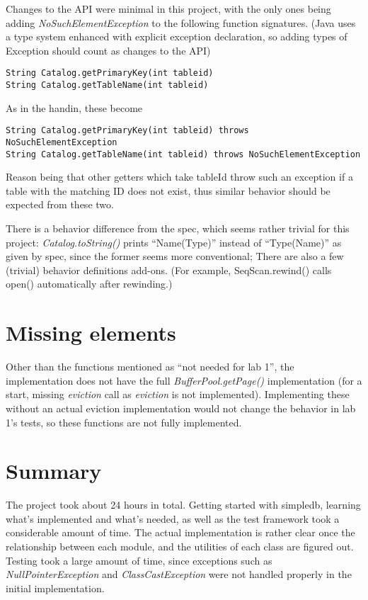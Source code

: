 \documentclass[11pt]{article}
\begin{document}
Changes to the API were minimal in this project, with the only ones being adding \textit{NoSuchElementException} to the following function signatures. (Java uses a type system enhanced with explicit exception declaration, so adding types of Exception should count as changes to the API)

\begin{lstlisting}
String Catalog.getPrimaryKey(int tableid) 
String Catalog.getTableName(int tableid) 
\end{lstlisting}
As in the handin, these become
\begin{lstlisting}
String Catalog.getPrimaryKey(int tableid) throws NoSuchElementException
String Catalog.getTableName(int tableid) throws NoSuchElementException
\end{lstlisting}

Reason being that other getters which take tableId throw such an exception if a table with the matching ID does not exist, thus similar behavior should be expected from these two.

There is a behavior difference from the spec, which seems rather trivial for this project: \textit{Catalog.toString()} prints ``Name(Type)'' instead of ``Type(Name)'' as given by spec, since the former seems more conventional; There are also a few (trivial) behavior definitions add-ons. (For example, SeqScan.rewind() calls open() automatically after rewinding.)

\section{Missing elements}

Other than the functions mentioned as ``not needed for lab 1'', the implementation does not have the full \textit{BufferPool.getPage()} implementation (for a start, missing \textit{eviction} call as \textit{eviction} is not implemented). Implementing these without an actual eviction implementation would not change the behavior in lab 1's tests, so these functions are not fully implemented.

\section{Summary}

The project took about 24 hours in total. Getting started with simpledb, learning what's implemented and what's needed, as well as the test framework took a considerable amount of time. The actual implementation is rather clear once the relationship between each module, and the utilities of each class are figured out. Testing took a large amount of time, since exceptions such as \textit{NullPointerException} and \textit{ClassCastException} were not handled properly in the initial implementation.
\end{document}
